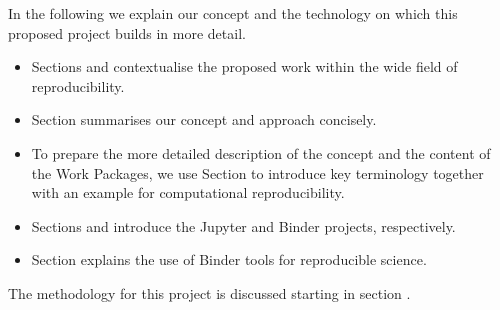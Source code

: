 In the following we explain our concept and the technology on which this
proposed project builds in more detail.
\begin{itemize}
\item Sections  and
   contextualise the proposed work
  within the wide field of reproducibility.
\item Section  summarises our concept and
  approach concisely.

\item To prepare the more detailed description of the concept and the content of
  the Work Packages, we use Section
   to introduce key terminology
  together with an example for computational reproducibility.

\item Sections  and 
  introduce the Jupyter and Binder projects, respectively.

\item Section  explains the use of
  Binder tools for reproducible science.
\end{itemize}
  
\noindent The methodology for this project is discussed starting in section
.




%
%
%
%
%
%
%
%

